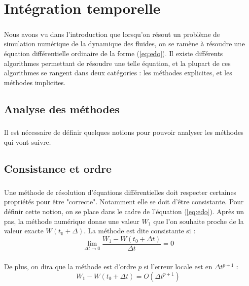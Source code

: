 \chapter{Intégration temporelle}

\paragraph{}
Nous avons vu dans l'introduction que lorsqu'on résout un problème de simulation numérique de la dynamique des fluides, on se ramène à résoudre une équation différentielle ordinaire de la forme (\ref{eq:edo}).
Il existe différents algorithmes permettant de résoudre une telle équation, et la plupart de ces algorithmes se rangent dans deux catégories : les méthodes explicites, et les méthodes implicites.

\section{Analyse des méthodes}

  \paragraph{}
  Il est nécessaire de définir quelques notions pour pouvoir analyser les méthodes qui vont suivre.

  \section{Consistance et ordre}

    \paragraph{}
    Une méthode de résolution d'équations différentielles doit respecter certaines propriétés pour être "correcte".
    Notamment elle se doit d'être consistante.
    Pour définir cette notion, on se place dans le cadre de l'équation (\ref{eq:edo}).
    Après un pas, la méthode numérique donne une valeur $W_1$ que l'on souhaite proche de la valeur exacte $W\left(t_0 + \Delta\right)$.
    La méthode est dite consistante si :
    \[\lim_{\Delta t \rightarrow 0} \frac{W_1 - W\left(t_0 + \Delta t\right)}{\Delta t} = 0\]

    \paragraph{}
    De plus, on dira que la méthode est d'ordre $p$ si l'erreur locale est en $\Delta t^{p+1}$ :
    \[W_1 - W\left(t_0 + \Delta t\right) = O\left(\Delta t^{p+1}\right)\]


